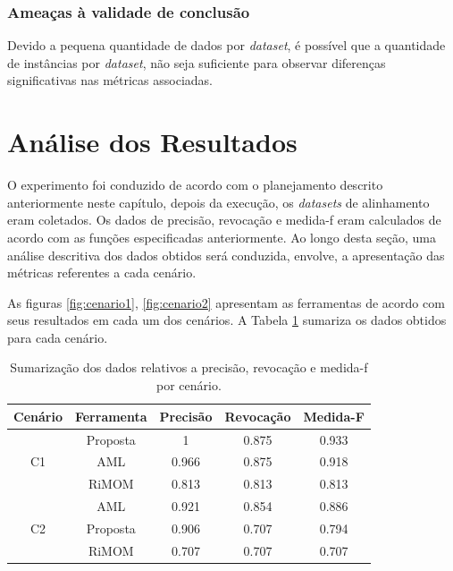 \subsubsection{Ameaças à validade de conclusão}
Devido a pequena quantidade de dados por \textit{dataset}, é possível que a quantidade de instâncias por \textit{dataset}, não seja suficiente para observar diferenças significativas nas métricas associadas.

\section{Análise dos Resultados}
O experimento foi conduzido de acordo com o planejamento descrito anteriormente neste capítulo, depois da execução, os \textit{datasets} de alinhamento eram coletados. Os dados de precisão, revocação e medida-f eram calculados de acordo com as funções especificadas anteriormente.
Ao longo desta seção, uma análise descritiva dos dados obtidos será conduzida, envolve, a apresentação das métricas referentes a cada cenário.

As figuras \ref{fig:cenario1}, \ref{fig:cenario2} apresentam as ferramentas de acordo com seus resultados em cada um dos cenários. A Tabela \ref{tab:resultados} sumariza os dados obtidos para cada cenário.

\begin{table}[h]
	\centering
	\caption{Sumarização dos dados relativos a precisão, revocação e medida-f por cenário.}
	\label{tab:resultados}
	\begin{tabular}{|c|c|c|c|c|}
		\hline
		      Cenário       & Ferramenta & Precisão & Revocação & Medida-F \\ \hline
		\multirow{3}{*}{C1} &  Proposta  &    1     &   0.875   &  0.933   \\ \cline{2-5}
		                    &    AML     &  0.966   &   0.875   &  0.918   \\ \cline{2-5}
		                    &   RiMOM    &  0.813   &   0.813   &  0.813   \\ \hline
		\multirow{3}{*}{C2} &    AML     &  0.921   &   0.854   &  0.886   \\ \cline{2-5}
		                    &  Proposta  &  0.906   &   0.707   &  0.794   \\ \cline{2-5}
		                    &   RiMOM    &  0.707   &   0.707   &  0.707   \\ \hline
	\end{tabular}
\end{table}

